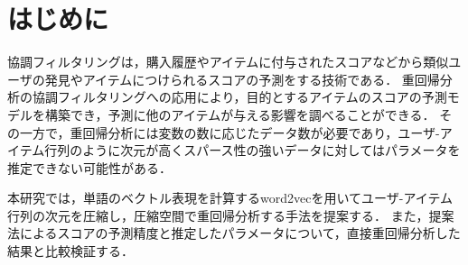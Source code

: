 \section{はじめに}
協調フィルタリング\cite{xsu}は，購入履歴やアイテムに付与されたスコアなどから類似ユーザの発見やアイテムにつけられるスコアの予測をする技術である．
重回帰分析の協調フィルタリングへの応用により，目的とするアイテムのスコアの予測モデルを構築でき，予測に他のアイテムが与える影響を調べることができる．
その一方で，重回帰分析には変数の数に応じたデータ数が必要であり，ユーザ-アイテム行列のように次元が高くスパース性の強いデータに対してはパラメータを推定できない可能性がある．

本研究では，単語のベクトル表現を計算するword2vec\cite{mik}を用いてユーザ-アイテム行列の次元を圧縮し，圧縮空間で重回帰分析する手法を提案する．
また，提案法によるスコアの予測精度と推定したパラメータについて，直接重回帰分析した結果と比較検証する．
